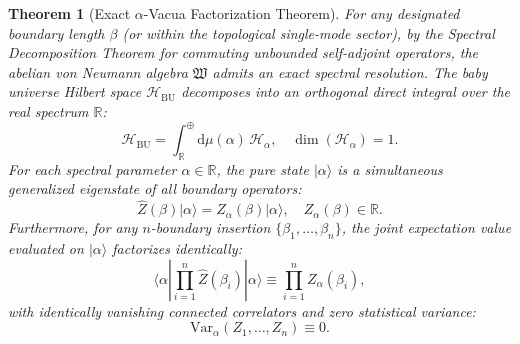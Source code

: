 \documentclass[11pt,a4paper,reqno]{article}
\theoremstyle{plain}
\newtheorem{theorem}{Theorem}[section]
\theoremstyle{definition}
\theoremstyle{remark}
\numberwithin{equation}{section}
\newcommand{\R}{\mathbb{R}}
\newcommand{\Hbu}{\mathcal{H}_{\mathrm{BU}}}
\newcommand{\Zop}{\widehat{Z}}
\newcommand{\diff}{\mathrm{d}}
\begin{document}
\begin{theorem}[Exact $\alpha$-Vacua Factorization Theorem]
\label{thm:exact_factorization}
For any designated boundary length $\beta$ (or within the topological single-mode sector), by the Spectral Decomposition Theorem for commuting unbounded self-adjoint operators, the abelian von Neumann algebra $\mathfrak{W}$ admits an exact spectral resolution. The baby universe Hilbert space $\Hbu$ decomposes into an orthogonal direct integral over the real spectrum $\R$:
\begin{equation}
  \Hbu = \int_{\R}^{\oplus} \diff\mu(\alpha) \, \mathcal{H}_\alpha, \quad \dim(\mathcal{H}_\alpha) = 1.
\end{equation}
For each spectral parameter $\alpha \in \R$, the pure state $|\alpha\rangle$ is a simultaneous generalized eigenstate of all boundary operators:
\begin{equation}
  \Zop(\beta) |\alpha\rangle = Z_\alpha(\beta) |\alpha\rangle, \quad Z_\alpha(\beta) \in \R.
\end{equation}
Furthermore, for any $n$-boundary insertion $\{\beta_1, \dots, \beta_n\}$, the joint expectation value evaluated on $|\alpha\rangle$ factorizes identically:
\begin{equation}
  \langle \alpha | \prod_{i=1}^n \Zop(\beta_i) | \alpha \rangle \equiv \prod_{i=1}^n Z_\alpha(\beta_i),
  \label{eq:exact_factorization_proof}
\end{equation}
with identically vanishing connected correlators and zero statistical variance:
\begin{equation}
  \mathrm{Var}_\alpha(Z_1, \dots, Z_n) \equiv 0.
\end{equation}
\end{theorem}
\end{document}
